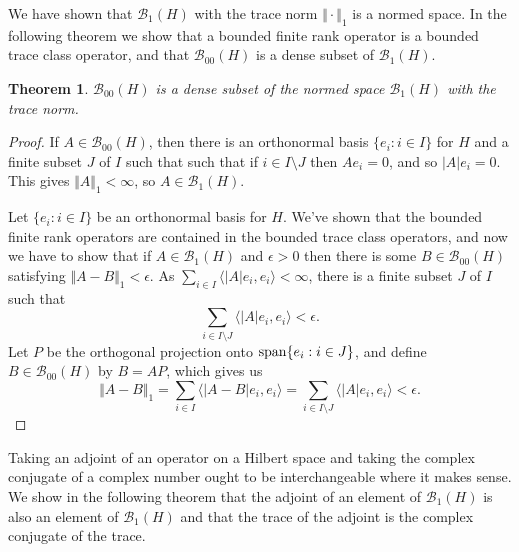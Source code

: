 \documentclass{article}
\newcommand{\inner}[2]{\langle #1, #2 \rangle}
\newcommand{\Span}{\ensuremath\mathrm{span}}
\newcommand{\norm}[1]{\Vert #1 \Vert}
\newtheorem{theorem}{Theorem}
\begin{document}
We have shown that $\mathscr{B}_1(H)$ with the trace norm $\norm{\cdot}_1$ is a normed space. In the following theorem we show that
a bounded finite rank operator is a bounded trace class operator, and that $\mathscr{B}_{00}(H)$ is a dense subset of $\mathscr{B}_1(H)$. 


\begin{theorem}
$\mathscr{B}_{00}(H)$ is a dense subset of the normed space $\mathscr{B}_1(H)$ with the trace norm.
\end{theorem}
\begin{proof}
If $A \in \mathscr{B}_{00}(H)$, then there is an 
orthonormal basis  $\{e_i: i \in I\}$ for $H$ and a finite subset $J$ of $I$ such that
such that if $i \in I \setminus J$ then $Ae_i=0$, and so $|A|e_i=0$. This gives $\norm{A}_1<\infty$, so $A \in \mathscr{B}_1(H)$.

Let $\{e_i:i \in I\}$ be an orthonormal basis for $H$.
We've shown that the bounded finite rank operators are contained in the bounded trace class operators, and now we have to show that
if $A \in \mathscr{B}_1(H)$ and $\epsilon>0$ then there is some $B \in \mathscr{B}_{00}(H)$ satisfying $\norm{A-B}_1 < \epsilon$.
As $\sum_{i \in I} \inner{|A|e_i}{e_i}<\infty$, there is a finite subset $J$ of $I$ such that
\[
\sum_{i \in I \setminus J} \inner{|A|e_i}{e_i}<\epsilon.
\]
Let $P$ be the orthogonal projection onto $\Span \{e_i:i \in J\}$, and define $B \in \mathscr{B}_{00}(H)$ by $B=AP$, which gives us
\[
\norm{A-B}_1 = \sum_{i \in I} \inner{|A-B|e_i}{e_i} = \sum_{i \in I \setminus J} \inner{|A|e_i}{e_i} < \epsilon.
\]
\end{proof}


Taking an adjoint of an operator on a Hilbert space and taking the complex conjugate of a complex number ought to be interchangeable where it makes sense. We show
in the following theorem that the adjoint of an element of $\mathscr{B}_1(H)$ is also an element of $\mathscr{B}_1(H)$ and that the trace of the adjoint is the complex conjugate of the trace.
\end{document}
